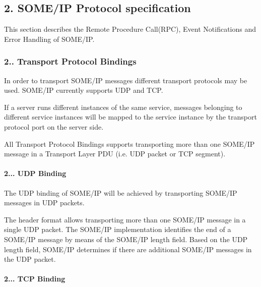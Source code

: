 \subsection*{2. S\+O\+M\+E/\+IP Protocol specification}

This section describes the Remote Procedure Call(\+R\+P\+C), Event Notifications and Error Handling of S\+O\+M\+E/\+IP.

\subsubsection*{2.. Transport Protocol Bindings}


\begin{DoxyItemize}
\item In order to transport S\+O\+M\+E/\+IP messages different transport protocols may be used. S\+O\+M\+E/\+IP currently supports U\+DP and T\+CP.
\item If a server runs different instances of the same service, messages belonging to different service instances will be mapped to the service instance by the transport protocol port on the server side.
\item All Transport Protocol Bindings supports transporting more than one S\+O\+M\+E/\+IP message in a Transport Layer P\+DU (i.\+e. U\+DP packet or T\+CP segment).
\end{DoxyItemize}

\paragraph*{2... U\+DP Binding}


\begin{DoxyItemize}
\item The U\+DP binding of S\+O\+M\+E/\+IP will be achieved by transporting S\+O\+M\+E/\+IP messages in U\+DP packets.
\item The header format allows transporting more than one S\+O\+M\+E/\+IP message in a single U\+DP packet. The S\+O\+M\+E/\+IP implementation identifies the end of a S\+O\+M\+E/\+IP message by means of the S\+O\+M\+E/\+IP length field. Based on the U\+DP length field, S\+O\+M\+E/\+IP determines if there are additional S\+O\+M\+E/\+IP messages in the U\+DP packet.
\end{DoxyItemize}

\paragraph*{2... T\+CP Binding}


